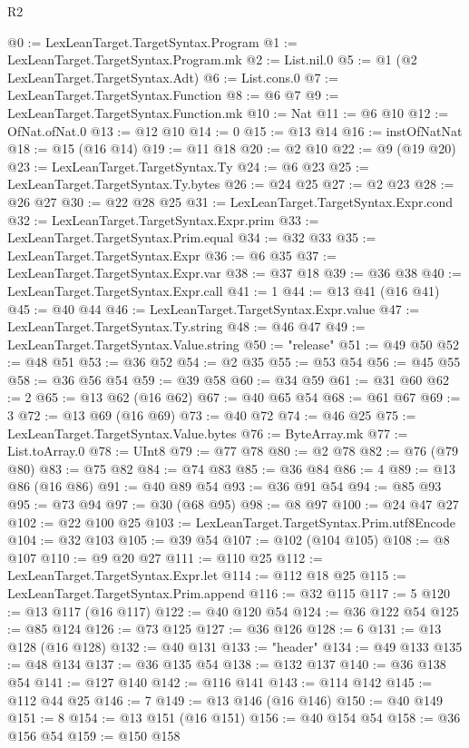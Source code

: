 \begin{lexlean}{R2}
\begin{coremodule}
@0 := LexLeanTarget.TargetSyntax.Program
@1 := LexLeanTarget.TargetSyntax.Program.mk
@2 := List.nil.{0}
@5 := @1 (@2 LexLeanTarget.TargetSyntax.Adt)
@6 := List.cons.{0}
@7 := LexLeanTarget.TargetSyntax.Function
@8 := @6 @7
@9 := LexLeanTarget.TargetSyntax.Function.mk
@10 := Nat
@11 := @6 @10
@12 := OfNat.ofNat.{0}
@13 := @12 @10
@14 := 0
@15 := @13 @14
@16 := instOfNatNat
@18 := @15 (@16 @14)
@19 := @11 @18
@20 := @2 @10
@22 := @9 (@19 @20)
@23 := LexLeanTarget.TargetSyntax.Ty
@24 := @6 @23
@25 := LexLeanTarget.TargetSyntax.Ty.bytes
@26 := @24 @25
@27 := @2 @23
@28 := @26 @27
@30 := @22 @28 @25
@31 := LexLeanTarget.TargetSyntax.Expr.cond
@32 := LexLeanTarget.TargetSyntax.Expr.prim
@33 := LexLeanTarget.TargetSyntax.Prim.equal
@34 := @32 @33
@35 := LexLeanTarget.TargetSyntax.Expr
@36 := @6 @35
@37 := LexLeanTarget.TargetSyntax.Expr.var
@38 := @37 @18
@39 := @36 @38
@40 := LexLeanTarget.TargetSyntax.Expr.call
@41 := 1
@44 := @13 @41 (@16 @41)
@45 := @40 @44
@46 := LexLeanTarget.TargetSyntax.Expr.value
@47 := LexLeanTarget.TargetSyntax.Ty.string
@48 := @46 @47
@49 := LexLeanTarget.TargetSyntax.Value.string
@50 := "release"
@51 := @49 @50
@52 := @48 @51
@53 := @36 @52
@54 := @2 @35
@55 := @53 @54
@56 := @45 @55
@58 := @36 @56 @54
@59 := @39 @58
@60 := @34 @59
@61 := @31 @60
@62 := 2
@65 := @13 @62 (@16 @62)
@67 := @40 @65 @54
@68 := @61 @67
@69 := 3
@72 := @13 @69 (@16 @69)
@73 := @40 @72
@74 := @46 @25
@75 := LexLeanTarget.TargetSyntax.Value.bytes
@76 := ByteArray.mk
@77 := List.toArray.{0}
@78 := UInt8
@79 := @77 @78
@80 := @2 @78
@82 := @76 (@79 @80)
@83 := @75 @82
@84 := @74 @83
@85 := @36 @84
@86 := 4
@89 := @13 @86 (@16 @86)
@91 := @40 @89 @54
@93 := @36 @91 @54
@94 := @85 @93
@95 := @73 @94
@97 := @30 (@68 @95)
@98 := @8 @97
@100 := @24 @47 @27
@102 := @22 @100 @25
@103 := LexLeanTarget.TargetSyntax.Prim.utf8Encode
@104 := @32 @103
@105 := @39 @54
@107 := @102 (@104 @105)
@108 := @8 @107
@110 := @9 @20 @27
@111 := @110 @25
@112 := LexLeanTarget.TargetSyntax.Expr.let
@114 := @112 @18 @25
@115 := LexLeanTarget.TargetSyntax.Prim.append
@116 := @32 @115
@117 := 5
@120 := @13 @117 (@16 @117)
@122 := @40 @120 @54
@124 := @36 @122 @54
@125 := @85 @124
@126 := @73 @125
@127 := @36 @126
@128 := 6
@131 := @13 @128 (@16 @128)
@132 := @40 @131
@133 := "header"
@134 := @49 @133
@135 := @48 @134
@137 := @36 @135 @54
@138 := @132 @137
@140 := @36 @138 @54
@141 := @127 @140
@142 := @116 @141
@143 := @114 @142
@145 := @112 @44 @25
@146 := 7
@149 := @13 @146 (@16 @146)
@150 := @40 @149
@151 := 8
@154 := @13 @151 (@16 @151)
@156 := @40 @154 @54
@158 := @36 @156 @54
@159 := @150 @158

\end{coremodule}
\end{lexlean}

